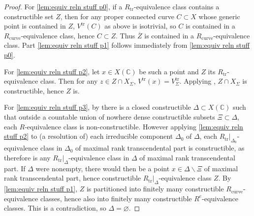 \documentclass[10pt,a4paper]{amsart}
\def\bC{\mathbb{C}}
\renewcommand{\bar}[1]{\ol{#1}}
\newcommand{\bs}{\backslash}
\newcommand{\ol}{\overline}
\def\trans{\mathrm{tr}}
\begin{document}
\begin{proof}
For \eqref{lem:equiv reln stuff p0}, if a $R_\trans$-equivalence class contains a constructible set $Z$, then for any proper connected curve $C\subset X$ whose generic point is contained in $Z$, $V^\trans(C)$ as above is isotrivial, so $C$ is contained in a $R_\mathrm{curve}$-equivalence class, hence $C\subset Z$.  Thus $\bar Z$ is contained in a $R_\mathrm{curve}$-equivalence class.  Part \eqref{lem:equiv reln stuff p1} follows immediately from \eqref{lem:equiv reln stuff p0}.



For \eqref{lem:equiv reln stuff p2}, let $x\in X(\bC)$ be such a point and $Z$ its $R_\trans$-equivalence class.  Then for any $z\in Z\cap X_\Sigma$, $V^\trans(x)=V^\trans_\Sigma$.  Applying , $Z\cap X_\Sigma$ is constructible, hence $Z$ is.

For \eqref{lem:equiv reln stuff p3}, by  there is a closed constructible $\Delta\subset X(\bC)$ such that outside a countable union of nowhere dense constructible subsets $\Xi\subset \Delta$, each $R$-equivalence class is non-constructible. However applying \eqref{lem:equiv reln stuff p2} to (a resolution of) each irreducible component $\Delta_0$ of $\Delta$, each $R_\trans|_{\Delta_0}$-equivalence class in $\Delta_0$ of maximal rank transcendental part is constructible, as therefore is any $R_\trans|_\Delta$-equivalence class in $\Delta$ of maximal rank transcendental part.  If $\Delta$ were nonempty, there would then be a point $x\in\Delta\bs \Xi$ of maximal rank transcendental part, hence constructible $R_\trans|_\Delta$-equivalence class $Z$.  By \eqref{lem:equiv reln stuff p1}, $Z$ is partitioned into finitely many constructible $R_\mathrm{curve}$-equivalence classes, hence also into finitely many constructible $R^e$-equivalence classes.  This is a contradiction, so $\Delta=\varnothing$. 
\end{proof}
\end{document}
